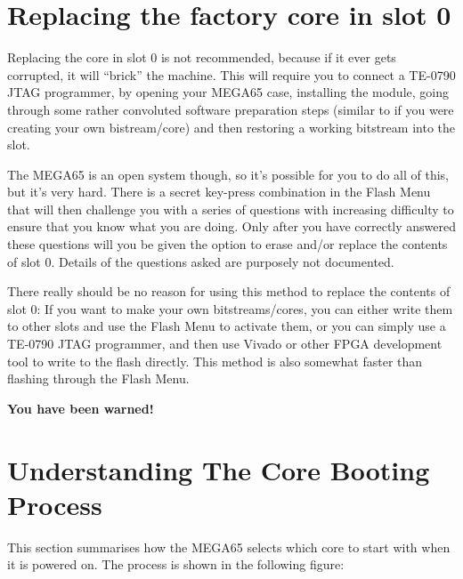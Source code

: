 \section{Replacing the factory core in slot 0}

Replacing the core in slot 0 is not recommended, because if it ever gets corrupted, it will ``brick'' the machine.
This will require you to connect a TE-0790 JTAG programmer, by opening your MEGA65 case, installing
the module, going through some rather convoluted software preparation steps (similar to if you were
creating your own bistream/core) and then restoring a working bitstream into the slot.

The MEGA65 is an open system though, so it's possible for you to do all of this, but it's very hard. There
is a secret key-press combination in the Flash Menu that will then challenge you with a series of questions with
increasing difficulty to ensure that you know what you are doing. Only after you have correctly
answered these questions will you be given the option to erase and/or replace the contents of slot 0.
Details of the questions asked are purposely not documented.

There really should be no reason for using this method to replace the contents of slot 0:
If you want to make your own bitstreams/cores, you can either write them to other slots and use the
Flash Menu to activate them, or you can simply use a TE-0790 JTAG programmer, and then use
Vivado or other FPGA development tool to write to the flash directly. This method is also
somewhat faster than flashing through the Flash Menu.

{\bf You have been warned!}

\section{Understanding The Core Booting Process}

This section summarises how the MEGA65 selects which core to start with when it is powered on.
The process is shown in the following figure:

